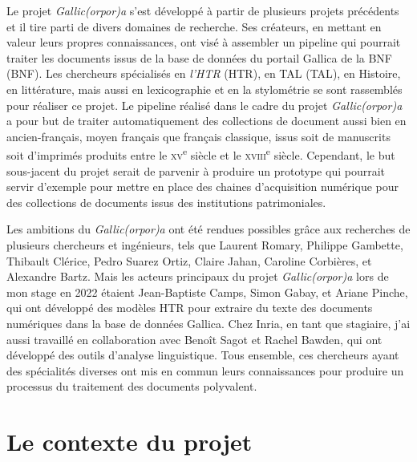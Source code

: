 \documentclass[class=article, crop=false]{standalone}
\begin{document}
Le projet \textit{Gallic(orpor)a} s'est développé à partir de plusieurs projets précédents et il tire parti de divers domaines de recherche. Ses créateurs, en mettant en valeur leurs propres connaissances, ont visé à assembler un pipeline qui pourrait traiter les documents issus de la base de données du portail Gallica de la \acrlong{BNF} (\acrshort{BNF}). Les chercheurs spécialisés en \textit{l'\acrlong{HTR}} (\acrshort{HTR}), en \acrlong{TAL} (\acrshort{TAL}), en Histoire, en littérature, mais aussi en lexicographie et en la stylométrie se sont rassemblés pour réaliser ce projet. Le pipeline réalisé dans le cadre du projet \textit{Gallic(orpor)a} a pour but de traiter automatiquement des collections de document aussi bien en ancien-français, moyen français que français classique, issus soit de manuscrits soit d'imprimés produits entre le \textsc{xv}\textsuperscript{e} siècle et le \textsc{xviii}\textsuperscript{e} siècle. Cependant, le but sous-jacent du projet serait de parvenir à produire un prototype qui pourrait servir d'exemple pour mettre en place des chaines d'acquisition numérique pour des collections de documents issus des institutions patrimoniales.

Les ambitions du \textit{Gallic(orpor)a} ont été rendues possibles grâce aux recherches de plusieurs chercheurs et ingénieurs, tels que Laurent Romary, Philippe Gambette, Thibault Clérice, Pedro Suarez Ortiz, Claire Jahan, Caroline Corbières, et Alexandre Bartz. Mais les acteurs principaux du projet \textit{Gallic(orpor)a} lors de mon stage en 2022 étaient Jean-Baptiste Camps, Simon Gabay, et Ariane Pinche, qui ont développé des modèles \acrshort{HTR} pour extraire du texte des documents numériques dans la base de données Gallica. Chez \Gls{Inria}, en tant que stagiaire, j'ai aussi travaillé en collaboration avec Benoît Sagot et Rachel Bawden, qui ont développé des outils d'analyse linguistique. Tous ensemble, ces chercheurs ayant des spécialités diverses ont mis en commun leurs connaissances pour produire un processus du traitement des documents polyvalent.

\section{Le contexte du projet}
\end{document}
